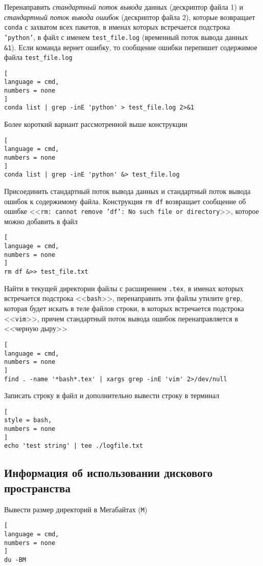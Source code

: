 \documentclass[%
	11pt,
	a4paper,
	utf8,
		]{article}
\begin{document}
Перенаправить \emph{стандартный поток вывода} данных (дескриптор файла 1) и \emph{стандартный поток вывода ошибок} (дескриптор файла 2), которые возвращает \texttt{conda} с захватом всех пакетов, в именах которых встречается подстрока \texttt{'python'}, в файл с именем \texttt{test\_file.log} (временный поток вывода данных \texttt{\&1}). Если команда вернет ошибку, то сообщение ошибки перепишет содержимое файла \texttt{test\_file.log}
\begin{lstlisting}[
language = cmd,
numbers = none
]
conda list | grep -inE 'python' > test_file.log 2>&1
\end{lstlisting}

Более короткий вариант рассмотренной выше конструкции
\begin{lstlisting}[
language = cmd,
numbers = none
]
conda list | grep -inE 'python' &> test_file.log
\end{lstlisting}

Присоединить стандартный поток вывода данных и стандартный поток вывода ошибок к содержимому файла. Конструкция \texttt{rm df} возвращает сообщение об ошибке <<\texttt{rm: cannot remove 'df': No such file or directory}>>, которое можно добавить в файл
\begin{lstlisting}[
language = cmd,
numbers = none
]
rm df &>> test_file.txt
\end{lstlisting}

Найти в текущей директории файлы с расширением \texttt{.tex}, в именах которых встречается подстрока <<\texttt{bash}>>, перенаправить эти файлы утилите \texttt{grep}, которая будет искать в теле файлов строки, в которых встречается подстрока <<\texttt{vim}>>, причем стандартный поток вывода ошибок перенаправляется в <<черную дыру>>
\begin{lstlisting}[
language = cmd,
numbers = none
]
find . -name '*bash*.tex' | xargs grep -inE 'vim' 2>/dev/null
\end{lstlisting}

Записать строку в файл и дополнительно вывести строку в терминал
\begin{lstlisting}[
style = bash,
numbers = none
]
echo 'test string' | tee ./logfile.txt
\end{lstlisting}

\subsection{Информация об использовании дискового пространства}

Вывести размер директорий в Мегабайтах (\texttt{M})
\begin{lstlisting}[
language = cmd,
numbers = none
]
du -BM
\end{lstlisting}
\end{document}
